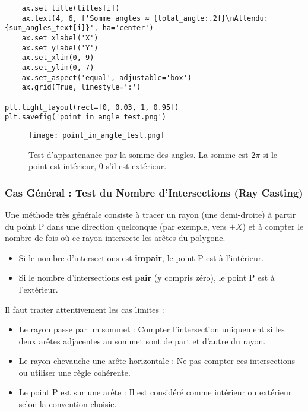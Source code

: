 \documentclass{article}
\begin{document}
\begin{verbatim}
    ax.set_title(titles[i])
    ax.text(4, 6, f'Somme angles ≈ {total_angle:.2f}\nAttendu: {sum_angles_text[i]}', ha='center')
    ax.set_xlabel('X')
    ax.set_ylabel('Y')
    ax.set_xlim(0, 9)
    ax.set_ylim(0, 7)
    ax.set_aspect('equal', adjustable='box')
    ax.grid(True, linestyle=':')

plt.tight_layout(rect=[0, 0.03, 1, 0.95])
plt.savefig('point_in_angle_test.png')
\end{verbatim}

\begin{figure}[H]
\centering
\texttt{[image: point\_in\_angle\_test.png]}
\caption{Test d'appartenance par la somme des angles. La somme est $2\pi$ si le point est intérieur, $0$ s'il est extérieur.}
\label{fig:point_in_angle_test}
\end{figure}

\subsubsection{Cas Général : Test du Nombre d'Intersections (Ray Casting)}
Une méthode très générale consiste à tracer un rayon (une demi-droite) à partir du point P dans une direction quelconque (par exemple, vers $+X$) et à compter le nombre de fois où ce rayon intersecte les arêtes du polygone.
\begin{itemize}
    \item Si le nombre d'intersections est \textbf{impair}, le point P est à l'intérieur.
    \item Si le nombre d'intersections est \textbf{pair} (y compris zéro), le point P est à l'extérieur.
\end{itemize}
Il faut traiter attentivement les cas limites :
\begin{itemize}
    \item Le rayon passe par un sommet : Compter l'intersection uniquement si les deux arêtes adjacentes au sommet sont de part et d'autre du rayon.
    \item Le rayon chevauche une arête horizontale : Ne pas compter ces intersections ou utiliser une règle cohérente.
    \item Le point P est sur une arête : Il est considéré comme intérieur ou extérieur selon la convention choisie.
\end{itemize}
\end{document}
